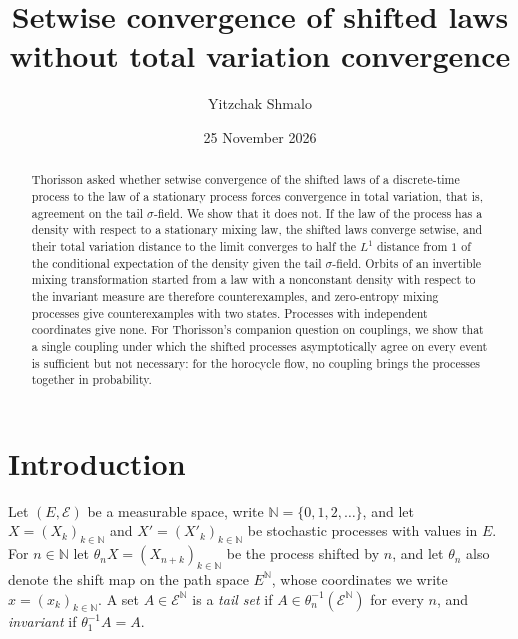 \documentclass[11pt]{amsart}
\theoremstyle{definition}
\theoremstyle{remark}
\newcommand{\N}{\mathbb N}
\newcommand{\cE}{\mathcal E}
\begin{document}
\title{Setwise convergence of shifted laws without total variation convergence}
\author{Yitzchak Shmalo}
\date{25 November 2026}
\address{Einstein Institute of Mathematics, The Hebrew University of Jerusalem, Jerusalem, Israel}

\begin{abstract}
Thorisson asked whether setwise convergence of the shifted laws of a discrete-time process to the law of a stationary
process forces convergence in total variation, that is, agreement on the tail $\sigma$-field. We show that it does not.
If the law of the process has a density with respect to a stationary mixing law, the shifted laws converge setwise,
and their total variation distance to the limit converges to half the $L^1$ distance from $1$ of the conditional expectation of the density given the
tail $\sigma$-field. Orbits of an invertible mixing transformation started from a law with a nonconstant density with respect to the
invariant measure are therefore
counterexamples, and zero-entropy mixing processes give counterexamples with two states. Processes with independent
coordinates give none. For Thorisson's companion question on couplings, we show that a single coupling under which the
shifted processes asymptotically agree on every event is sufficient but not necessary: for the horocycle flow, no
coupling brings the processes together in probability.
\end{abstract}

\maketitle

\section{Introduction}\label{sec:intro}

Let $(E,\cE)$ be a measurable space, write $\N=\{0,1,2,\dots\}$, and let $X=(X_k)_{k\in\N}$ and $X'=(X'_k)_{k\in\N}$
be stochastic processes with values in $E$. For $n\in\N$ let $\theta_n X=(X_{n+k})_{k\in\N}$ be the process shifted by
$n$, and let $\theta_n$ also denote the shift map on the path space $E^\N$, whose coordinates we write
$x=(x_k)_{k\in\N}$. A set $A\in\cE^{\N}$ is a \emph{tail set} if
$A\in\theta_n^{-1}(\cE^{\N})$ for every $n$, and \emph{invariant} if $\theta_1^{-1}A=A$.
\end{document}

